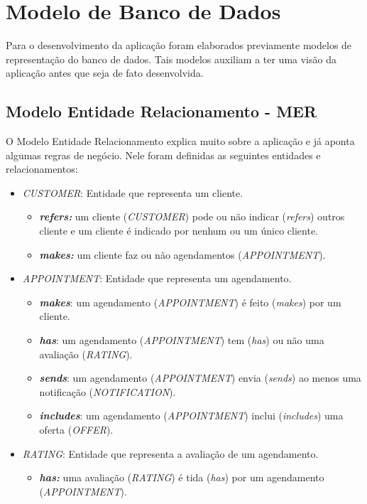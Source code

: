 \section{Modelo de Banco de Dados}
Para o desenvolvimento da aplicação foram elaborados previamente modelos de representação do banco de dados. Tais modelos auxiliam a ter uma visão da aplicação antes que seja de fato desenvolvida.
\subsection{Modelo Entidade Relacionamento - MER}
O Modelo Entidade Relacionamento explica muito sobre a aplicação e já aponta algumas regras de negócio.
Nele foram definidas as seguintes entidades e relacionamentos:
\begin{itemize}
	\item \emph{CUSTOMER}: Entidade que representa um cliente.
	\begin{itemize}
		\item \textbf{\textit{refers:}} um cliente (\emph{CUSTOMER}) pode ou não indicar (\textit{refers}) outros cliente e um cliente é indicado por nenhum ou um único cliente.
		\item \textbf{\textit{makes:}} um cliente faz ou não agendamentos (\emph{APPOINTMENT}).
	\end{itemize}
	\item \emph{APPOINTMENT}: Entidade que representa um agendamento.
	\begin{itemize}
		\item \textbf{\textit{makes}}: um agendamento (\emph{APPOINTMENT}) é feito (\textit{makes}) por um cliente. 
		\item \textbf{\textit{has}}: um agendamento (\emph{APPOINTMENT}) tem (\textit{has}) ou não uma avaliação (\emph{RATING}).
		\item \textbf{\textit{sends}}: um agendamento (\emph{APPOINTMENT}) envia (\textit{sends}) ao menos uma notificação (\emph{NOTIFICATION}).
		\item \textbf{\textit{includes}}: um agendamento (\emph{APPOINTMENT}) inclui (\textit{includes}) uma oferta (\emph{OFFER}).
	\end{itemize}
	\item \emph{RATING}: Entidade que representa a avaliação de um agendamento.
	\begin{itemize}
		\item \textbf{\textit{has:}} uma avaliação (\emph{RATING}) é tida (\textit{has}) por um agendamento (\emph{APPOINTMENT}).
	\end{itemize}

\end{itemize}
